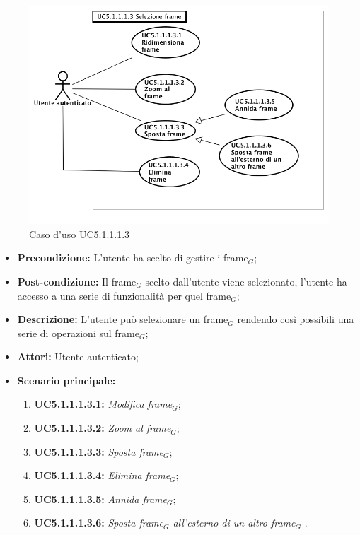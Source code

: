 \begin{figure}[h]
	\begin{center}
	\includegraphics[scale=0.4]{diagram/UC5-1-1-1-3.png}
	\caption{Caso d'uso UC5.1.1.1.3}
	\end{center}
\end{figure}
\begin{itemize}
	\item \textbf{Precondizione:} L'utente ha scelto di gestire i frame$_G$;
	\item \textbf{Post-condizione:} Il frame$_G$ scelto dall'utente viene selezionato, l'utente ha accesso a una serie di funzionalità per quel frame$_G$;
	\item \textbf{Descrizione:} L'utente può selezionare un frame$_G$ rendendo così possibili una serie di operazioni sul frame$_G$;
	\item \textbf{Attori:} Utente autenticato;
	\item \textbf{Scenario principale:}
	\begin{enumerate}
		\item \textbf{ UC5.1.1.1.3.1:} \textit{ Modifica frame$_G$};
		\item \textbf{ UC5.1.1.1.3.2:} \textit{ Zoom al frame$_G$};
		\item \textbf{ UC5.1.1.1.3.3:} \textit{ Sposta frame$_G$};
		\item \textbf{ UC5.1.1.1.3.4:} \textit{ Elimina frame$_G$};
		\item \textbf{ UC5.1.1.1.3.5:} \textit{ Annida frame$_G$};
		\item \textbf{ UC5.1.1.1.3.6:} \textit{ Sposta frame$_G$ all'esterno di un altro frame$_G$  }.
	\end{enumerate}
\end{itemize}
